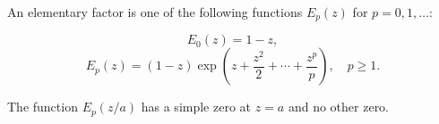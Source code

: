 An elementary factor is one of the following functions $E_p(z)$ for $p = 0, 1, \ldots$:

$$E_0(z) = 1 - z,$$
$$E_p(z) = (1 - z) \exp \left( z + \frac{z^2}{2} + \cdots + \frac{z^p}{p} \right), \quad p \geq 1.$$

The function $E_p(z/a)$ has a simple zero at $z = a$ and no other zero.
